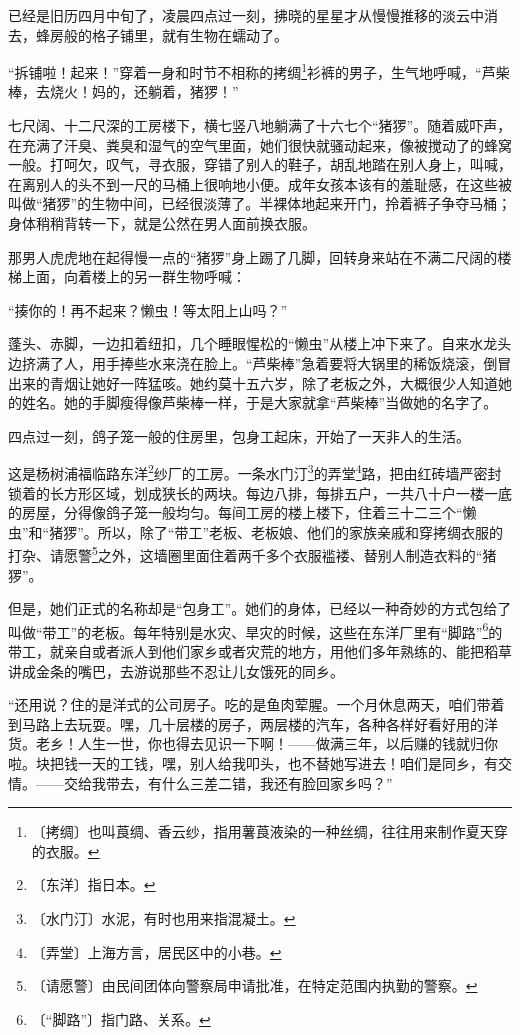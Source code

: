 \documentclass[12pt,UTF-8,openany]{ctexbook}
\begin{document}
\begin{normalsize}
    
    已经是旧历四月中旬了，凌晨四点过一刻，拂晓的星星才从慢慢推移的淡云中消去，蜂房般的格子铺里，就有生物在蠕动了。
    
    “拆铺啦！起来！”穿着一身和时节不相称的拷绸\footnote{〔拷绸〕也叫莨绸、香云纱，指用薯莨液染的一种丝绸，往往用来制作夏天穿的衣服。}衫裤的男子，生气地呼喊，“芦柴棒，去烧火！妈的，还躺着，猪猡！”
    
    七尺阔、十二尺深的工房楼下，横七竖八地躺满了十六七个“猪猡”。随着威吓声，在充满了汗臭、粪臭和湿气的空气里面，她们很快就骚动起来，像被搅动了的蜂窝一般。打呵欠，叹气，寻衣服，穿错了别人的鞋子，胡乱地踏在别人身上，叫喊，在离别人的头不到一尺的马桶上很响地小便。成年女孩本该有的羞耻感，在这些被叫做“猪猡”的生物中间，已经很淡薄了。半裸体地起来开门，拎着裤子争夺马桶；身体稍稍背转一下，就是公然在男人面前换衣服。
    
    那男人虎虎地在起得慢一点的“猪猡”身上踢了几脚，回转身来站在不满二尺阔的楼梯上面，向着楼上的另一群生物呼喊：
    
    “揍你的！再不起来？懒虫！等太阳上山吗？”
    
    蓬头、赤脚，一边扣着纽扣，几个睡眼惺松的“懒虫”从楼上冲下来了。自来水龙头边挤满了人，用手捧些水来浇在脸上。“芦柴棒”急着要将大锅里的稀饭烧滚，倒冒出来的青烟让她好一阵猛咳。她约莫十五六岁，除了老板之外，大概很少人知道她的姓名。她的手脚瘦得像芦柴棒一样，于是大家就拿“芦柴棒”当做她的名字了。
    
    四点过一刻，鸽子笼一般的住房里，包身工起床，开始了一天非人的生活。
    
    这是杨树浦福临路东洋\footnote{〔东洋〕指日本。}纱厂的工房。一条水门汀\footnote{〔水门汀〕水泥，有时也用来指混凝土。}的弄堂\footnote{〔弄堂〕上海方言，居民区中的小巷。}路，把由红砖墙严密封锁着的长方形区域，划成狭长的两块。每边八排，每排五户，一共八十户一楼一底的房屋，分得像鸽子笼一般均匀。每间工房的楼上楼下，住着三十二三个“懒虫”和“猪猡”。所以，除了“带工”老板、老板娘、他们的家族亲戚和穿拷绸衣服的打杂、请愿警\footnote{〔请愿警〕由民间团体向警察局申请批准，在特定范围内执勤的警察。}之外，这墙圈里面住着两千多个衣服褴褛、替别人制造衣料的“猪猡”。
    
    但是，她们正式的名称却是“包身工”。她们的身体，已经以一种奇妙的方式包给了叫做“带工”的老板。每年特别是水灾、旱灾的时候，这些在东洋厂里有“脚路”\footnote{〔“脚路”〕指门路、关系。}的带工，就亲自或者派人到他们家乡或者灾荒的地方，用他们多年熟练的、能把稻草讲成金条的嘴巴，去游说那些不忍让儿女饿死的同乡。
    
    “还用说？住的是洋式的公司房子。吃的是鱼肉荤腥。一个月休息两天，咱们带着到马路上去玩耍。嘿，几十层楼的房子，两层楼的汽车，各种各样好看好用的洋货。老乡！人生一世，你也得去见识一下啊！——做满三年，以后赚的钱就归你啦。块把钱一天的工钱，嘿，别人给我叩头，也不替她写进去！咱们是同乡，有交情。——交给我带去，有什么三差二错，我还有脸回家乡吗？”
    

\end{normalsize}
\end{document}
